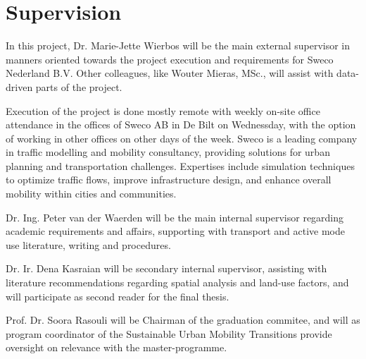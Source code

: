 \documentclass[sigconf, natbib=false, nonacm]{acmart}
\begin{document}
    \section{Supervision}
        In this project, Dr. Marie-Jette Wierbos will be the main external supervisor in manners oriented towards the project execution and requirements for Sweco Nederland B.V. Other colleagues, like Wouter Mieras, MSc., will assist with data-driven parts of the project. 
        
        Execution of the project is done mostly remote with weekly on-site office attendance in the offices of Sweco AB in De Bilt on Wednessday, with the option of working in other offices on other days of the week. Sweco is a leading company in traffic modelling and mobility consultancy, providing solutions for urban planning and transportation challenges. Expertises include simulation techniques to optimize traffic flows, improve infrastructure design, and enhance overall mobility within cities and communities.

        Dr. Ing. Peter van der Waerden will be the main internal supervisor regarding academic requirements and affairs, supporting with transport and active mode use literature, writing and procedures. 

        Dr. Ir. Dena Kasraian will be secondary internal supervisor, assisting with literature recommendations regarding spatial analysis and land-use factors, and will participate as second reader for the final thesis. 

        Prof. Dr. Soora Rasouli will be Chairman of the graduation commitee, and will as program coordinator of the Sustainable Urban Mobility Transitions provide oversight on relevance with the master-programme.        
\end{document}
